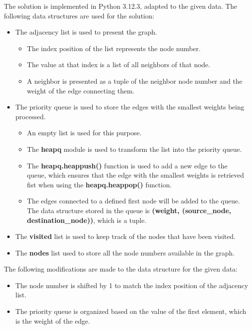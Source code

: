 \documentclass{article}
\begin{document}
  The solution is implemented in Python 3.12.3, adapted to the given data. 
  The following data structures are used for the solution: 
  \begin{itemize}
    \item The adjacency list is used to present the graph. 
    \begin{itemize}
      \item The index position of the list represents the node number.
      \item The value at that index is a list of all neighbors of that node. 
      \item A neighbor is presented as a tuple of the neighbor node number and the weight of the edge connecting them. 
    \end{itemize}
    \item The priority queue is used to store the edges with the smallest weights being processed. 
    \begin{itemize}
      \item An empty list is used for this purpose. 
      \item The \textbf{heapq} module is used to transform the list into the priority queue. 
      \item The \textbf{heapq.heappush()} function is used to add a new edge to the queue, which 
      ensures that the edge with the smallest weights is retrieved fist when using the \textbf{heapq.heappop()} function.
      \item The edges connected to a defined first node will be added to the queue. 
      The data structure stored in the queue is \textbf{(weight, (source\_node, destination\_node))}, 
      which is a tuple.
    \end{itemize}
    \item The \textbf{visited} list is used to keep track of the nodes that have been visited.
    \item The \textbf{nodes} list used to store all the node numbers available in the graph.
  \end{itemize}
  
  The following modifications are made to the data structure for the given data: 
  \begin{itemize}
    \item The node number is shifted by 1 to match the index position of the adjacency list.
    \item The priority queue is organized based on the value of the first element, which is the weight of the edge.
  \end{itemize}
\end{document}
